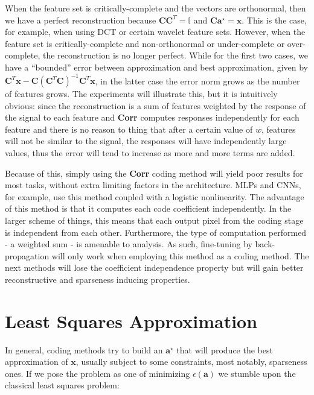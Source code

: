 \documentclass[12pt,a4paper,oneside,english]{UPBThesis}
\begin{document}
When the feature set is critically-complete and the vectors are orthonormal, then we have a perfect reconstruction because $\textbf{C}\textbf{C}^T = \mathbb{I}$ and $\textbf{C}\textbf{a}^\star = \textbf{x}$. This is the case, for example, when using DCT or certain wavelet feature sets. However, when the feature set is critically-complete and non-orthonormal or under-complete or over-complete, the reconstruction is no longer perfect. While for the first two cases, we have a ``bounded'' error between approximation and best approximation, given by $\textbf{C}^T\textbf{x} - \textbf{C}(\textbf{C}^T\textbf{C})^{-1}\textbf{C}^T\textbf{x}$, in the latter case the error norm grows as the number of features grows. The experiments will illustrate this, but it is intuitively obvious: since the reconstruction is a sum of features weighted by the response of the signal to each feature and \textbf{Corr} computes responses independently for each feature and there is no reason to thing that after a certain value of $w$, features will not be similar to the signal, the responses will have independently large values, thus the error will tend to increase as more and more terms are added.

Because of this, simply using the \textbf{Corr} coding method will yield poor results for most tasks, without extra limiting factors in the architecture. MLPs and CNNs, for example, use this method coupled with a logistic nonlinearity. The advantage of this method is that it computes each code coefficient independently. In the larger scheme of things, this means that each output pixel from the coding stage is independent from each other. Furthermore, the type of computation performed - a weighted sum - is amenable to analysis. As such, fine-tuning by back-propagation will only work when employing this method as a coding method. The next methods will lose the coefficient independence property but will gain better reconstructive and sparseness inducing properties.

\section{Least Squares Approximation}
\label{sec:LeastSquaresApproximation}

In general, coding methods try to build an $\textbf{a}^\star$ that will produce the best approximation of $\textbf{x}$, usually subject to some constraints, most notably, sparseness ones. If we pose the problem as one of minimizing $\epsilon(\textbf{a})$ we stumble upon the classical least squares problem:
\end{document}
